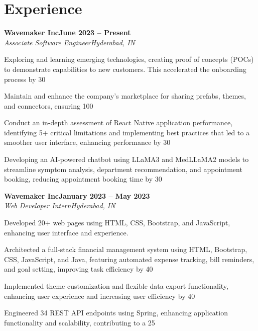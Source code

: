 \documentclass[letterpaper,10pt]{article}
\newcommand{\heading}[2]{
  \hspace{10pt}#1\hfill#2\\
}
\newcommand{\headingBf}[2]{
  \heading{\textbf{#1}}{\textbf{#2}}
}
\newcommand{\headingIt}[2]{
  \heading{\textit{#1}}{\textit{#2}}
}
\newenvironment{resume_list}{
  \vspace{-7pt}
  \begin{itemize}[itemsep=-2px, parsep=1pt, leftmargin=30pt]
}{
  \end{itemize}
}
\begin{document}
  \section{Experience}
  \headingBf{Wavemaker Inc}{June 2023 -- Present}
  \headingIt{Associate Software Engineer}{Hyderabad, IN}
  \begin{resume_list}
    \item Exploring and learning emerging technologies, creating proof of concepts (POCs) to demonstrate capabilities to new customers. This accelerated the onboarding process by 30
    \item Maintain and enhance the company’s marketplace for sharing prefabs, themes, and connectors, ensuring 100
    \item Conduct an in-depth assessment of React Native application performance, identifying 5+ critical limitations and implementing best practices that led to a smoother user interface, enhancing performance by 30
    \item Developing an AI-powered chatbot using LLaMA3 and MedLLaMA2 models to streamline symptom analysis, department recommendation, and appointment booking, reducing appointment booking time by 30
  \end{resume_list}
  \headingBf{Wavemaker Inc}{January 2023 -- May 2023}
  \headingIt{Web Developer Intern}{Hyderabad, IN}
  \begin{resume_list}
    \item Developed 20+ web pages using HTML, CSS, Bootstrap, and JavaScript, enhancing user interface and experience.
    \item Architected a full-stack financial management system using HTML, Bootstrap, CSS, JavaScript, and Java, featuring automated expense tracking, bill reminders, and goal setting, improving task efficiency by 40
    \item Implemented theme customization and flexible data export functionality, enhancing user experience and increasing user efficiency by 40
    \item Engineered 34 REST API endpoints using Spring, enhancing application functionality and scalability, contributing to a 25
  \end{resume_list}
\end{document}

